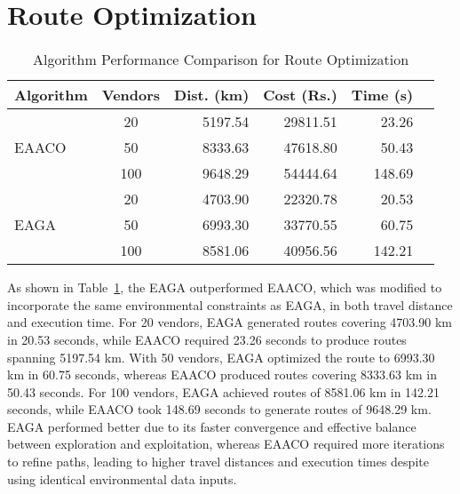 \section{Route Optimization}
\begin{table}[htbp]
    \centering
    \small
    \caption{Algorithm Performance Comparison for Route Optimization}
    \label{tab:perf-ro}
    \begin{tabular}{lcrrrr}
        \toprule
        \textbf{Algorithm} & \textbf{Vendors} & \textbf{Dist. (km)} & \textbf{Cost (Rs.)} & \textbf{Time (s)} \\
        \midrule
        \multirow{3}{*}{EAACO}
                           & 20               & 5197.54             & 29811.51            & 23.26             \\
                           & 50               & 8333.63             & 47618.80            & 50.43             \\
                           & 100              & 9648.29             & 54444.64            & 148.69            \\
        \midrule
        \multirow{3}{*}{EAGA}
                           & 20               & 4703.90             & 22320.78            & 20.53             \\
                           & 50               & 6993.30             & 33770.55            & 60.75             \\
                           & 100              & 8581.06             & 40956.56            & 142.21            \\
        \bottomrule
    \end{tabular}
\end{table}
As shown in Table~\ref{tab:perf-ro}, the EAGA outperformed EAACO\cite{dorigo1997ant}, which was modified to incorporate the same environmental constraints as EAGA, in both travel distance and execution time. For 20 vendors, EAGA generated routes covering 4703.90 km in 20.53 seconds, while EAACO required 23.26 seconds to produce routes spanning 5197.54 km. With 50 vendors, EAGA optimized the route to 6993.30 km in 60.75 seconds, whereas EAACO produced routes covering 8333.63 km in 50.43 seconds. For 100 vendors, EAGA achieved routes of 8581.06 km in 142.21 seconds, while EAACO took 148.69 seconds to generate routes of 9648.29 km. EAGA performed better due to its faster convergence and effective balance between exploration and exploitation, whereas EAACO required more iterations to refine paths, leading to higher travel distances and execution times despite using identical environmental data inputs.


